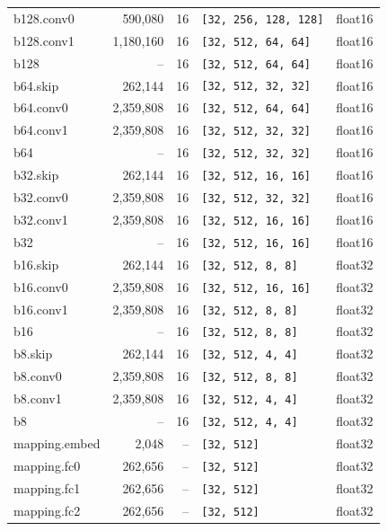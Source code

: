 \begin{footnotesize}
\begin{longtable}{@{}lrrll@{}}
b128.conv0     & 590{,}080 & 16 & \texttt{[32, 256, 128, 128]} & float16 \\
b128.conv1     & 1{,}180{,}160 & 16 & \texttt{[32, 512, 64, 64]} & float16 \\
b128           & --       & 16  & \texttt{[32, 512, 64, 64]}   & float16 \\
b64.skip       & 262{,}144 & 16 & \texttt{[32, 512, 32, 32]}   & float16 \\
b64.conv0      & 2{,}359{,}808 & 16 & \texttt{[32, 512, 64, 64]} & float16 \\
b64.conv1      & 2{,}359{,}808 & 16 & \texttt{[32, 512, 32, 32]} & float16 \\
b64            & --       & 16  & \texttt{[32, 512, 32, 32]}   & float16 \\
b32.skip       & 262{,}144 & 16 & \texttt{[32, 512, 16, 16]}   & float16 \\
b32.conv0      & 2{,}359{,}808 & 16 & \texttt{[32, 512, 32, 32]} & float16 \\
b32.conv1      & 2{,}359{,}808 & 16 & \texttt{[32, 512, 16, 16]} & float16 \\
b32            & --       & 16  & \texttt{[32, 512, 16, 16]}   & float16 \\
b16.skip       & 262{,}144 & 16 & \texttt{[32, 512, 8, 8]}     & float32 \\
b16.conv0      & 2{,}359{,}808 & 16 & \texttt{[32, 512, 16, 16]} & float32 \\
b16.conv1      & 2{,}359{,}808 & 16 & \texttt{[32, 512, 8, 8]}   & float32 \\
b16            & --       & 16  & \texttt{[32, 512, 8, 8]}     & float32 \\
b8.skip        & 262{,}144 & 16 & \texttt{[32, 512, 4, 4]}     & float32 \\
b8.conv0       & 2{,}359{,}808 & 16 & \texttt{[32, 512, 8, 8]}   & float32 \\
b8.conv1       & 2{,}359{,}808 & 16 & \texttt{[32, 512, 4, 4]}   & float32 \\
b8             & --       & 16  & \texttt{[32, 512, 4, 4]}     & float32 \\
mapping.embed  & 2{,}048  & --  & \texttt{[32, 512]}           & float32 \\
mapping.fc0    & 262{,}656 & -- & \texttt{[32, 512]}           & float32 \\
mapping.fc1    & 262{,}656 & -- & \texttt{[32, 512]}           & float32 \\
mapping.fc2    & 262{,}656 & -- & \texttt{[32, 512]}           & float32 \\

\end{longtable}
\end{footnotesize}
